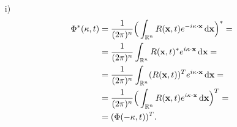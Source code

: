 \documentclass[mat2, tisk]{fmfdelo}
\newcommand{\R}{\mathbb R}
\newcommand{\bd}{\textbf}
\begin{document}
\begin{dokaz}
\hfill
\begin{enumerate}
  \item[i)] 
  \begin{align*}
  \Phi^*(\text{\bd{$\kappa$}}, t) &= \frac{1}{(2\pi)^n} \Big(\int_{\R^n} {R}(\bd{x}, t) e^{-i\text{\bd{$\kappa$}} \cdot \bd{x}} \dif \bd{x}\Big)^* = \\
  &= \frac{1}{(2\pi)^n} \int_{\R^n} {R}(\bd{x}, t)^* e^{i\text{\bd{$\kappa$}} \cdot \bd{x}} \dif \bd{x} = \\
  &= \frac{1}{(2\pi)^n} \int_{\R^n} ({R}(\bd{x}, t))^T e^{i\text{\bd{$\kappa$}} \cdot \bd{x}} \dif \bd{x} = \\
  &= \frac{1}{(2\pi)^n} \Big(\int_{\R^n} {R}(\bd{x}, t) e^{i\text{\bd{$\kappa$}} \cdot \bd{x}} \dif \bd{x}\Big)^T = \\
  &= (\Phi(-\text{\bd{$\kappa$}}, t))^T.
  \end{align*}


\end{enumerate}
\end{dokaz}
\end{document}
